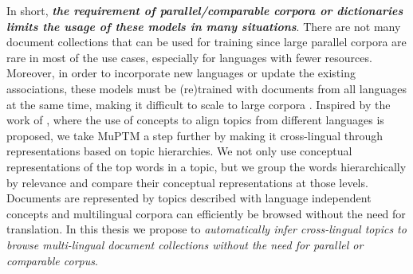 In short, \textbf{\textit{the requirement of parallel/comparable corpora or dictionaries limits the usage of these models in many situations}}. There are not many document collections that can be used for training since large parallel corpora are rare in most of the use cases, especially for languages with fewer resources. Moreover, in order to incorporate new languages or update the existing associations, these models must be (re)trained with documents from all languages at the same time, making it difficult to scale to large corpora \citep{Hao2018, Moritz2017}. Inspired by the work of \citep{10.5555/1870658.1870663}, where the use of concepts to align topics from different languages is proposed, we take MuPTM a step further by making it cross-lingual through representations based on topic hierarchies. We not only use conceptual representations of the top words in a topic, but we group the words hierarchically by relevance and compare their conceptual representations at those levels. Documents are represented by topics described with language independent concepts and multilingual corpora can efficiently be browsed without the need for translation. In this thesis we propose to \textit{automatically infer cross-lingual topics to browse multi-lingual document collections without the need for parallel or comparable corpus}. 
